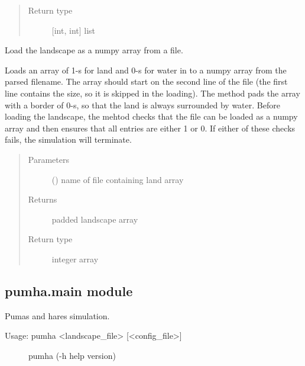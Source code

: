 \documentclass[letterpaper,10pt,english]{sphinxmanual}
\begin{document}
\begin{fulllineitems}
\begin{fulllineitems}
\begin{quote}
\begin{description}
\item[{Return type}] \leavevmode
{[}int, int{]} list

\end{description}\end{quote}

\end{fulllineitems}


\begin{fulllineitems}
\label{\detokenize{pumha:pumha.env.Landscape.load_landscape}}
Load the landscape as a numpy array from a file.

Loads an array of 1-s for land and 0-s for water in to a numpy
array from the parsed filename. The array should start on the
second line of the file (the first line contains the size, so it is
skipped in the loading). The method pads the array with a border of
0-s, so that the land is always surrounded by water.
Before loading the landscape, the mehtod checks that the file can be
loaded as a numpy array and then ensures that all entries are either 1
or 0. If either of these checks fails, the simulation will terminate.
\begin{quote}\begin{description}
\item[{Parameters}] \leavevmode
{} () \textendash{} name of file containing land array

\item[{Returns}] \leavevmode
padded landscape array

\item[{Return type}] \leavevmode
integer array

\end{description}\end{quote}

\end{fulllineitems}


\end{fulllineitems}



\subsection{pumha.main module}
\label{\detokenize{pumha:module-pumha.main}}\label{\detokenize{pumha:pumha-main-module}}
Pumas and hares simulation.
\begin{description}
\item[{Usage: pumha \textless{}landscape\_file\textgreater{} {[}\textless{}config\_file\textgreater{}{]}}] \leavevmode
pumha (-h \textbar{} \textendash{}help \textbar{} \textendash{}version)

\end{description}
\end{document}
